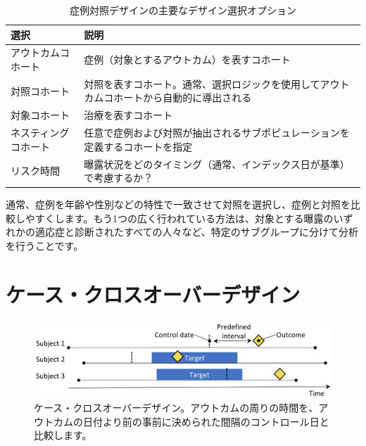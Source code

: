 \documentclass[
  11pt]{book}
\theoremstyle{definition}
\theoremstyle{definition}
\theoremstyle{definition}
\theoremstyle{definition}
\theoremstyle{remark}
\begin{document}
\begin{table}
\centering
\caption{\label{tab:ccChoices}症例対照デザインの主要なデザイン選択オプション}
\centering
\begin{tabular}[t]{l>{\raggedright\arraybackslash}p{9cm}}
\toprule
選択 & 説明\\
\midrule
アウトカムコホート & 症例（対象とするアウトカム）を表すコホート\\
対照コホート & 対照を表すコホート。通常、選択ロジックを使用してアウトカムコホートから自動的に導出される\\
対象コホート & 治療を表すコホート\\
ネスティングコホート & 任意で症例および対照が抽出されるサブポピュレーションを定義するコホートを指定\\
リスク時間 & 曝露状況をどのタイミング（通常、インデックス日が基準）で考慮するか？\\
\bottomrule
\end{tabular}
\end{table}

通常、症例を年齢や性別などの特性で一致させて対照を選択し、症例と対照を比較しやすくします。もう1つの広く行われている方法は、対象とする曝露のいずれかの適応症と診断されたすべての人々など、特定のサブグループに分けて分析を行うことです。

\section{ケース・クロスオーバーデザイン}\label{ux30b1ux30fcux30b9ux30afux30edux30b9ux30aaux30fcux30d0ux30fcux30c7ux30b6ux30a4ux30f3}


\begin{figure}[h]

{\centering \includegraphics[width=0.9\linewidth]{images/PopulationLevelEstimation/caseCrossover} 

}

\caption{ケース・クロスオーバーデザイン。アウトカムの周りの時間を、アウトカムの日付より前の事前に決められた間隔のコントロール日と比較します。}\label{fig:caseCrossover}
\end{figure}
\end{document}
